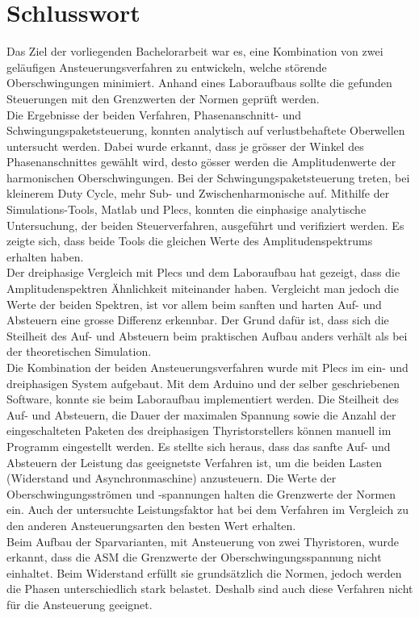 \section{Schlusswort}
Das Ziel der vorliegenden Bachelorarbeit war es, eine Kombination von zwei geläufigen Ansteuerungsverfahren zu entwickeln, welche störende Oberschwingungen minimiert. Anhand eines Laboraufbaus sollte die gefunden Steuerungen mit den Grenzwerten der Normen geprüft werden.\\ 
Die Ergebnisse der beiden Verfahren, Phasenanschnitt- und Schwingungspaketsteuerung, konnten analytisch auf verlustbehaftete Oberwellen untersucht werden. Dabei wurde erkannt, dass je grösser der Winkel des Phasenanschnittes gewählt wird, desto gösser werden die Amplitudenwerte der harmonischen Oberschwingungen. Bei der Schwingungspaketsteuerung treten, bei kleinerem Duty Cycle, mehr Sub- und Zwischenharmonische auf. Mithilfe der Simulations-Tools, Matlab und Plecs, konnten die einphasige analytische Untersuchung, der beiden Steuerverfahren, ausgeführt und verifiziert werden. Es zeigte sich, dass beide Tools die gleichen Werte des Amplitudenspektrums erhalten haben.\\ 
Der dreiphasige Vergleich mit Plecs und dem Laboraufbau hat gezeigt, dass die Amplitudenspektren Ähnlichkeit miteinander haben. Vergleicht man jedoch die Werte der beiden Spektren, ist vor allem beim sanften und harten Auf- und Absteuern eine grosse Differenz erkennbar. Der Grund dafür ist, dass sich die Steilheit des Auf- und Absteuern beim praktischen Aufbau anders verhält als bei der theoretischen Simulation.\\
Die Kombination der beiden Ansteuerungsverfahren wurde mit Plecs im ein- und dreiphasigen System aufgebaut. Mit dem Arduino und der selber geschriebenen Software, konnte sie beim Laboraufbau implementiert werden. Die Steilheit des Auf- und Absteuern, die Dauer der maximalen Spannung sowie die Anzahl der eingeschalteten Paketen des dreiphasigen Thyristorstellers können manuell im Programm eingestellt werden. Es stellte sich heraus, dass das sanfte Auf- und Absteuern der Leistung das geeignetste Verfahren ist, um die beiden Lasten (Widerstand und Asynchronmaschine) anzusteuern. Die Werte der Oberschwingungsströmen und -spannungen halten die Grenzwerte der Normen ein. Auch der untersuchte Leistungsfaktor hat bei dem Verfahren im Vergleich zu den anderen Ansteuerungsarten den besten Wert erhalten.\\
Beim Aufbau der Sparvarianten, mit Ansteuerung von zwei Thyristoren, wurde erkannt, dass die ASM die Grenzwerte der Oberschwingungsspannung nicht einhaltet. Beim Widerstand erfüllt sie grundsätzlich die Normen, jedoch werden die Phasen unterschiedlich stark belastet. Deshalb sind auch diese Verfahren nicht für die Ansteuerung geeignet.\\

